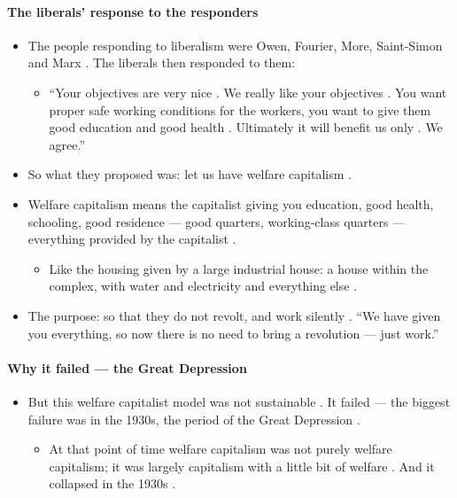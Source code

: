 \paragraph{The liberals' response to the responders}
\begin{itemize}
    \item The people responding to liberalism were Owen, Fourier, More, Saint-Simon and Marx . The liberals then responded to them:
    \begin{itemize}
        \item ``Your objectives are very nice . We really like your objectives . You want proper safe working conditions for the workers, you want to give them good education and good health . Ultimately it will benefit us only . We agree.'' 
    \end{itemize}
    \item So what they proposed was: let us have welfare capitalism .
    \item Welfare capitalism means the capitalist giving you education, good health, schooling, good residence --- good quarters, working-class quarters --- everything provided by the capitalist .
    \begin{itemize}
        \item Like the housing given by a large industrial house: a house within the complex, with water and electricity and everything else .
    \end{itemize}
    \item The purpose: so that they do not revolt, and work silently . ``We have given you everything, so now there is no need to bring a revolution --- just work.'' 
\end{itemize}

\paragraph{Why it failed --- the Great Depression}
\begin{itemize}
    \item But this welfare capitalist model was not sustainable . It failed --- the biggest failure was in the 1930s, the period of the Great Depression .
    \begin{itemize}
        \item At that point of time welfare capitalism was not purely welfare capitalism; it was largely capitalism with a little bit of welfare . And it collapsed in the 1930s .
    \end{itemize}
\end{itemize}

